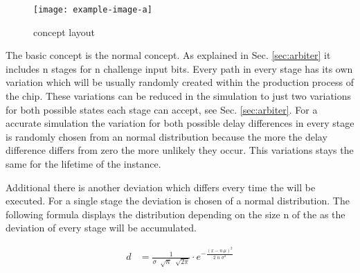 \begin{figure}[ht]
\noindent\texttt{[image: example-image-a]}
\caption{\apufs concept layout}
\label{fig:pufconceptlayout}
\end{figure}

The basic concept is the normal \apuf concept. 
As explained in Sec. \ref{sec:arbiter} it includes n stages for n challenge input bits.
Every path in every stage has its own variation which will be usually randomly created within the production process of the chip. 
These variations can be reduced in the simulation to just two variations for both possible states each stage can accept, see Sec. \ref{sec:arbiter}.
For a accurate simulation the variation for both possible delay differences in every stage is randomly chosen from an normal distribution because the more the delay difference differs from zero the more unlikely they occur.
This variations stays the same for the lifetime of the \puf instance.

Additional there is another deviation which differs every time the \puf will be executed.
For a single stage the deviation is chosen of a normal distribution. 
The following formula displays the distribution depending on the size n of the \puf as the deviation of every stage will be accumulated.

\begin{align*}
d &= \frac{1}{\sigma\;\sqrt[]{n}\;\sqrt[]{2\pi}} \cdot e^{-\frac{(x-n\,\mu)^2}{2\;n\;\sigma^2}}
\end{align*}

